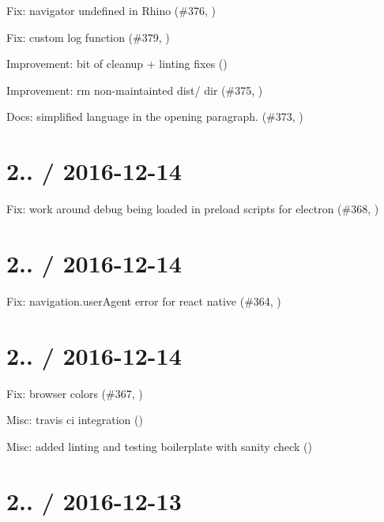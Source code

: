 \begin{DoxyItemize}
\item Fix\+: {\ttfamily navigator} undefined in Rhino (\#376, )
\item Fix\+: custom log function (\#379, )
\item Improvement\+: bit of cleanup + linting fixes ()
\item Improvement\+: rm non-\/maintainted {\ttfamily dist/} dir (\#375, )
\item Docs\+: simplified language in the opening paragraph. (\#373, )
\end{DoxyItemize}

\section*{2.. / 2016-\/12-\/14 }


\begin{DoxyItemize}
\item Fix\+: work around debug being loaded in preload scripts for electron (\#368, )
\end{DoxyItemize}

\section*{2.. / 2016-\/12-\/14 }


\begin{DoxyItemize}
\item Fix\+: navigation.\+user\+Agent error for react native (\#364, )
\end{DoxyItemize}

\section*{2.. / 2016-\/12-\/14 }


\begin{DoxyItemize}
\item Fix\+: browser colors (\#367, )
\item Misc\+: travis ci integration ()
\item Misc\+: added linting and testing boilerplate with sanity check ()
\end{DoxyItemize}

\section*{2.. / 2016-\/12-\/13 }


